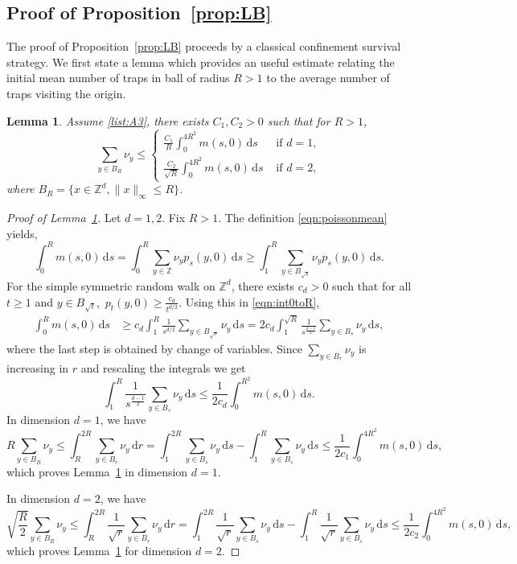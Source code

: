 \documentclass{article}[12pt]
\newtheorem{lemma}{Lemma}[section]
\theoremstyle{definition}
\newcommand{\Z}{\mathbb{Z}}
\newcommand{\1}{\mathbbm{1}}
\newcommand{\dd }{\mathrm{d} }
\begin{document}
\subsection{Proof of Proposition~\ref{prop:LB}}
The proof of Proposition~\ref{prop:LB} proceeds by a classical confinement survival strategy. We first state a lemma which provides an useful estimate relating the initial mean number of traps in ball of radius $R>1$ to the average number of traps visiting the origin. 

\begin{lemma}\label{lm:nuysum}
    Assume {\rm \ref{list:A3}}, there exists $C_1, C_2 >0$ such that for $R>1$, 
    \begin{equation}
        \sum_{y\in B_R} \nu_y \le \begin{cases}
            \frac{C_1}{R}\int_0^{4 R^2} m(s,0)\, \dd s  & \text{ if }d=1,\\
            \frac{C_2}{\sqrt{R}} \int_0^{4R^2} m(s,0)\, \dd s  & \text{ if }d=2,
        \end{cases}
        \end{equation}
    where $B_R = \{x\in \Z^d, \lVert x \rVert_\infty \le R\}$.
\end{lemma}

\begin{proof}[Proof of Lemma~\ref{lm:nuysum}]
Let $d=1,2$. Fix $R>1$. The definition \eqref{eqn:poissonmean} yields, 
 \begin{equation}
        \int_0^R m(s,0)\, \dd s = {\int_0^R \sum_{y\in \Z} \nu_y p_s(y,0) \, \dd s } \ge \int_1^R \sum_{y\in B_{\sqrt{s}}} \nu_y p_s(y,0) \, \dd s.
        \label{eqn:int0toR}
    \end{equation}
 \medskip
 For the simple symmetric random walk on $\Z^d$, there exists $c_d>0$ such that for all $t\ge1$ and $y\in B_{\sqrt{t}}$,
$
\,p_t(y,0)\ge \frac{c_d}{t^{d/2}}.
$
 Using this in \eqref{eqn:int0toR},
    \begin{align}
        \int_0^R m(s,0)\, \dd s &{\ge c_d\int_1^R \frac{1}{s^{d/2}}\sum_{y\in B_{\sqrt{s}}} \nu_y \, \dd s}
        = 2c_d \int_1^{\sqrt{R}}\frac{1}{s^{\frac{d-1}{2}}} \sum_{y\in B_s}\nu_y \, \dd s,
    \end{align}
    {where the last step is obtained by change of variables}. Since $ \sum_{y\in B_r}\nu_y $ is increasing in $r$ and rescaling the integrals we get 
$$\int_1^{{R}} \frac{1}{s^{\frac{d-1}{2}}} \sum_{y\in B_s}\nu_y \, \dd s \le  \frac{1}{2c_d}\int_0^{R^2} m(s,0)\, \dd s.$$
In dimension $d=1$, we have
$$ {R\sum_{y\in B_R}\nu_y \le \int_R^{2R} \sum_{y\in B_r}\nu_y \, \dd r =  \int_1^{{2R}} \sum_{y\in B_s}\nu_y \, \dd s -\int_1^{{R}} \sum_{y\in B_s}\nu_y \, \dd s \le \frac{1}{2c_1}\int_0^{4R^2} m(s,0)\, \dd s,}$$
which proves Lemma~\ref{lm:nuysum} in dimension $d = 1$.

\noindent In dimension $d=2$, we have
$$ {\sqrt{\frac{R}{2}}\sum_{y\in B_R}\nu_y \le \int_R^{2R} \frac{1}{\sqrt{r}} \sum_{y\in B_r}\nu_y \, \dd r =  \int_1^{{2R}} \frac{1}{\sqrt{r}} \sum_{y\in B_s}\nu_y \, \dd s -\int_1^{{R}} \frac{1}{\sqrt{r}}\sum_{y\in B_s}\nu_y \, \dd s \le \frac{1}{2c_2}\int_0^{4R^2} m(s,0)\, \dd s,}$$
which proves Lemma~\ref{lm:nuysum} for dimension $d = 2$.
\end{proof}
\end{document}
